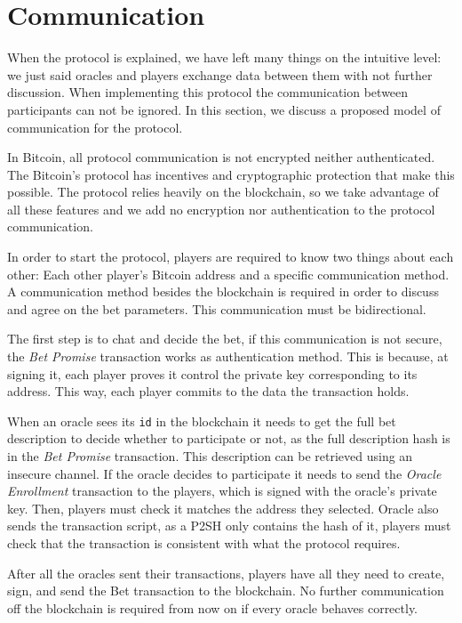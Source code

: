 \section{Communication}

When the protocol is explained, we have left many things on the intuitive level:
  we just said oracles and players exchange data between them with not further
  discussion.
When implementing this protocol the communication between participants can
  not be ignored.
In this section, we discuss a proposed model of communication for the protocol.

In Bitcoin, all protocol communication is not encrypted neither authenticated.
The Bitcoin's protocol has incentives and cryptographic protection that make
  this possible.
The protocol relies heavily on the blockchain, so we take advantage of all these
  features and we add no encryption nor authentication to the protocol
  communication.

In order to start the protocol, players are required to know two things about
  each other: Each other player's Bitcoin address and a specific communication
  method.
A communication method besides the blockchain is required in order to
  discuss and agree on the bet parameters.
This communication must be bidirectional.

The first step is to chat and decide the bet, if this communication is not
  secure, the \textit{Bet Promise} transaction works as authentication method.
This is because, at signing it, each player proves it control the private key
  corresponding to its address.
This way, each player commits to the data the transaction holds.

When an oracle sees its \texttt{id} in the blockchain it needs to get the full
  bet description to decide whether to participate or not, as the full
  description hash is in the \textit{Bet Promise} transaction.
This description can be retrieved using an insecure channel.
If the oracle decides to participate it needs to send the \textit{Oracle
  Enrollment} transaction to the players, which is signed with the oracle's
  private key.
Then, players must check it matches the address they selected.
Oracle also sends the transaction script, as a P2SH only contains the hash of
  it, players must check that the transaction is consistent with what the
  protocol requires.

After all the oracles sent their transactions, players have all they need
  to create, sign, and send the Bet transaction to the blockchain.
No further communication off the blockchain is required from now on if every
  oracle behaves correctly.


